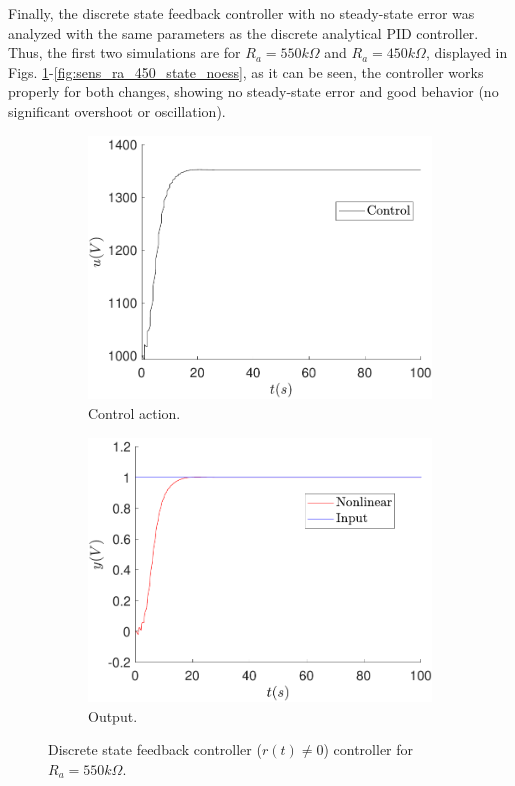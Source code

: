 	Finally, the discrete state feedback controller with no steady-state error was analyzed with the same parameters as the discrete analytical PID controller. Thus, the first two simulations are for $R_a=550k\Omega$ and $R_a=450k\Omega$, displayed in Figs. \ref{fig:sens_ra_550_state_noess}-\ref{fig:sens_ra_450_state_noess}, as it can be seen, the controller works properly for both changes, showing no steady-state error and good behavior (no significant overshoot or oscillation).
	
	\begin{figure}
        \centering
        \begin{subfigure}[b]{0.475\textwidth}
            \centering
            \includegraphics[scale=0.425]{files/sens_analysis/Ref!0/control_analysis_sfc_a_550_ref_dif_0.pdf}
            \caption{Control action.}
        \end{subfigure}
        \vskip0.1cm
        \begin{subfigure}[b]{0.475\textwidth}   
            \centering 
            \includegraphics[scale=0.425]{files/sens_analysis/Ref!0/analysis_sfc_a_550_ref_dif_0.pdf}            \caption{Output.}
        \end{subfigure}
        \caption{Discrete state feedback controller ($r(t)\neq0$) controller for $R_a=550k\Omega$.}
        \label{fig:sens_ra_550_state_noess}
	\end{figure}
	
